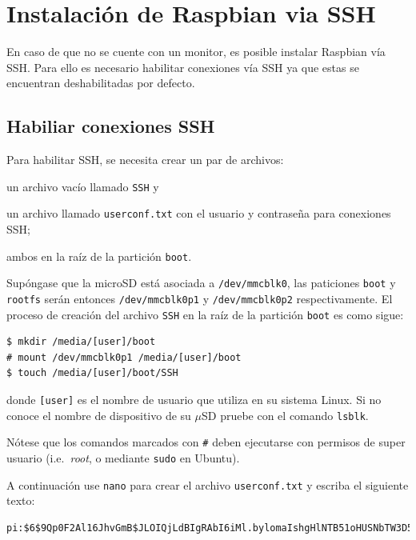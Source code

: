 \documentclass[letterpaper,10.5pt]{article}
\begin{document}
\section{Instalación de Raspbian via SSH}%
\label{sec:annex1}
En caso de que no se cuente con un monitor, es posible instalar Raspbian vía SSH. %
Para ello es necesario habilitar conexiones vía SSH ya que estas se encuentran deshabilitadas por defecto.



\subsection{Habiliar conexiones SSH}%
\label{sec:annex1-ssh-enable}
Para habilitar SSH, se necesita crear un par de archivos:
\begin{enumerate*}[label=\roman*\rpar]
	\item un archivo vacío llamado \texttt{SSH}
	y
	\item un archivo llamado \texttt{userconf.txt} con el usuario y contraseña para conexiones SSH; %
\end{enumerate*}
ambos en la raíz de la partición \texttt{boot}.

Supóngase que la microSD está asociada a \texttt{/dev/mmcblk0}, las paticiones \texttt{boot} y \texttt{rootfs} serán entonces \texttt{/dev/mmcblk0p1} y \texttt{/dev/mmcblk0p2} respectivamente.
El proceso de creación del archivo \texttt{SSH} en la raíz de la partición \texttt{boot} es como sigue:

\begin{Verbatim}[fontsize=\footnotesize]
$ mkdir /media/[user]/boot
# mount /dev/mmcblk0p1 /media/[user]/boot
$ touch /media/[user]/boot/SSH
\end{Verbatim}

\noindent donde \texttt{[user]} es el nombre de usuario que utiliza en su sistema Linux.
Si no conoce el nombre de dispositivo de su $\mu$SD pruebe con el comando \texttt{lsblk}.

Nótese que los comandos marcados con \texttt{\#} deben ejecutarse con permisos de super usuario (i.e.~\emph{root}, o mediante \texttt{sudo} en Ubuntu).

A continuación use \texttt{nano} para crear el archivo \texttt{userconf.txt} y escriba el siguiente texto:
\begin{Verbatim}[fontsize=\scriptsize]
pi:$6$9Qp0F2Al16JhvGmB$JLOIQjLdBIgRAbI6iMl.bylomaIshgHlNTB51oHUSNbTW3D5l6hEnPr6HEBtMo/0IKwlGkc7.FlFOhaMwPKB1/
\end{Verbatim}
\end{document}
